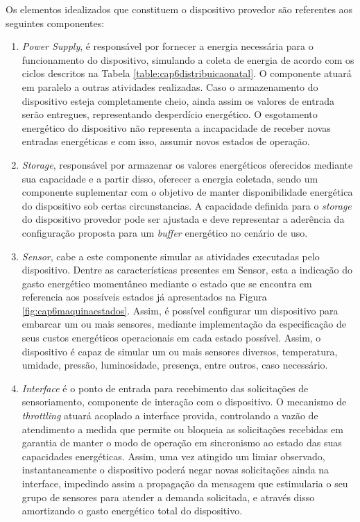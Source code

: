 Os elementos idealizados que constituem o dispositivo provedor são referentes aos seguintes componentes:
\begin{enumerate}
	\item \textit{Power Supply}, é responsável por fornecer a energia necessária para o funcionamento do dispositivo, simulando a coleta de energia de acordo com os ciclos descritos na Tabela \ref{table:cap6distribuicaonatal}. O componente atuará em paralelo a outras atividades realizadas. Caso o armazenamento do dispositivo esteja completamente cheio, ainda assim os valores de entrada serão entregues, representando desperdício energético. O esgotamento energético do dispositivo não representa a incapacidade de receber novas entradas energéticas e com isso, assumir novos estados de operação.  
	
	\item \textit{Storage}, responsável por armazenar os valores energéticos oferecidos mediante sua capacidade e a partir disso, oferecer a energia coletada, sendo um componente suplementar com o objetivo de manter disponibilidade energética do dispositivo sob certas circunstancias. A capacidade definida para o \textit{storage} do dispositivo provedor pode ser ajustada e deve representar a aderência da configuração proposta para um \textit{buffer} energético no cenário de uso.
	
	 \item \textit{Sensor}, cabe a este componente simular as atividades executadas pelo dispositivo. Dentre as características presentes em Sensor, esta a indicação do gasto energético momentâneo mediante o estado que se encontra em referencia aos possíveis estados já apresentados na Figura \ref{fig:cap6maquinaestados}. Assim, é possível configurar um dispositivo para embarcar um ou mais sensores, mediante implementação da especificação de seus custos energéticos operacionais em cada estado possível. Assim, o dispositivo é capaz de simular um ou mais sensores diversos, temperatura, umidade, pressão, luminosidade, presença, entre outros, caso necessário.
	 
	 \item \textit{Interface} é o ponto de entrada para recebimento das solicitações de sensoriamento, componente de interação com o dispositivo. O mecanismo de \textit{throttling} atuará acoplado a interface provida, controlando a vazão de atendimento a medida que permite ou bloqueia as solicitações recebidas em garantia de manter o modo de operação em sincronismo ao estado das suas capacidades energéticas. Assim, uma vez atingido um limiar observado, instantaneamente o dispositivo poderá negar novas solicitações ainda na interface, impedindo assim a propagação da mensagem que estimularia o seu grupo de sensores para atender a demanda solicitada, e através disso amortizando o gasto energético total do dispositivo.
	 
\end{enumerate}


